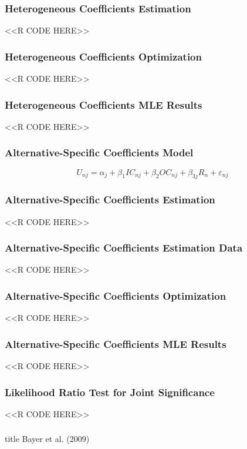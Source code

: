 \documentclass{beamer}
\begin{document}
\begin{frame}[fragile]\frametitle{Heterogeneous Coefficients Estimation}
    \vspace{1ex}
    <<R CODE HERE>>
\end{frame}

\begin{frame}[fragile]\frametitle{Heterogeneous Coefficients Optimization}
    <<R CODE HERE>>
\end{frame}

\begin{frame}[fragile]\frametitle{Heterogeneous Coefficients MLE Results}
    <<R CODE HERE>>
\end{frame}

\begin{frame}\frametitle{Alternative-Specific Coefficients Model}
    $$U_{nj} = \alpha_j + \beta_1 IC_{nj} + \beta_2 OC_{nj} + \beta_{3j} R_n + \varepsilon_{nj}$$
\end{frame}

\begin{frame}[fragile]\frametitle{Alternative-Specific Coefficients Estimation}
    <<R CODE HERE>>
\end{frame}

\begin{frame}[fragile]\frametitle{Alternative-Specific Coefficients Estimation Data}
    <<R CODE HERE>>
\end{frame}

\begin{frame}[fragile]\frametitle{Alternative-Specific Coefficients Optimization}
    <<R CODE HERE>>
\end{frame}

\begin{frame}[fragile]\frametitle{Alternative-Specific Coefficients MLE Results}
    <<R CODE HERE>>
\end{frame}

\begin{frame}[fragile]\frametitle{Likelihood Ratio Test for Joint Significance}
    <<R CODE HERE>>
\end{frame}

\begin{frame}\frametitle{}
    \vfill
    \centering
    \begin{beamercolorbox}[center]{title}
        \Large Bayer et al. (2009)
    \end{beamercolorbox}
    \vfill
\end{frame}
\end{document}

